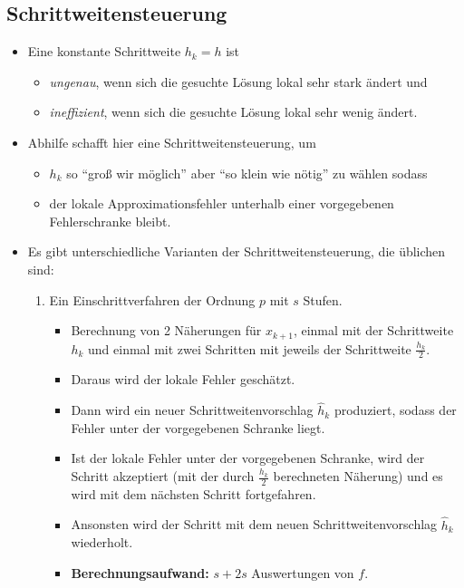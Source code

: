 		\subsection{Schrittweitensteuerung} %
			\begin{itemize}
				\item Eine konstante Schrittweite \( h _ k = h \) ist
					\begin{itemize}
						\item \textit{ungenau}, wenn sich die gesuchte Lösung lokal sehr stark ändert und
						\item \textit{ineffizient}, wenn sich die gesuchte Lösung lokal sehr wenig ändert.
					\end{itemize}
				\item Abhilfe schafft hier eine Schrittweitensteuerung, um
					\begin{itemize}
						\item \( h _ k \) so \enquote{groß wir möglich} aber \enquote{so klein wie nötig} zu wählen sodass
						\item der lokale Approximationsfehler unterhalb einer vorgegebenen Fehlerschranke bleibt.
					\end{itemize}
				\item Es gibt unterschiedliche Varianten der Schrittweitensteuerung, die üblichen sind:
					\begin{enumerate}
						\item Ein Einschrittverfahren der Ordnung \( p \) mit \( s \) Stufen.
							\begin{itemize}
								\item Berechnung von 2 Näherungen für \( x _ { k + 1 } \), einmal mit der Schrittweite \( h _ k \) und einmal mit zwei Schritten mit jeweils der Schrittweite \( \frac{h _ k}{2} \).
								\item Daraus wird der lokale Fehler geschätzt.
								\item Dann wird ein neuer Schrittweitenvorschlag \( \hat{h} _ k \) produziert, sodass der Fehler unter der vorgegebenen Schranke liegt.
								\item Ist der lokale Fehler unter der vorgegebenen Schranke, wird der Schritt akzeptiert (mit der durch \( \frac{h _ k}{2} \) berechneten Näherung) und es wird mit dem nächsten Schritt fortgefahren.
								\item Ansonsten wird der Schritt mit dem neuen Schrittweitenvorschlag \( \hat{h} _ k \) wiederholt.
								\item \textbf{Berechnungsaufwand:} \( s + 2s \) Auswertungen von \( f \).

\end{itemize}
\end{enumerate}
\end{itemize}
